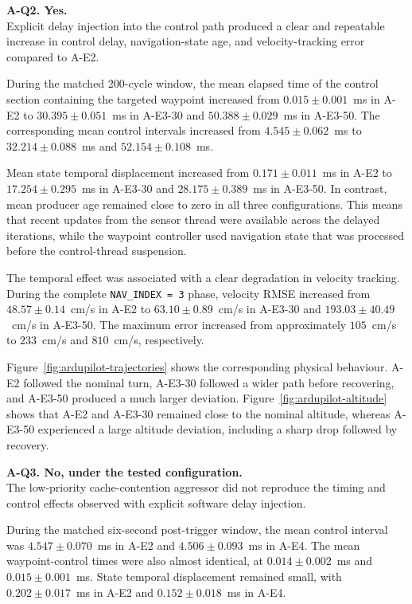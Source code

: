 \noindent \textbf{A-Q2. Yes.} \\
\noindent Explicit delay injection into the control path produced a clear and
repeatable increase in control delay, navigation-state age, and
velocity-tracking error compared to A-E2.

\noindent During the matched 200-cycle window, the mean elapsed time of the
control section containing the targeted waypoint increased from
\(0.015 \pm 0.001\)~ms in A-E2 to
\(30.395 \pm 0.051\)~ms in A-E3-30 and
\(50.388 \pm 0.029\)~ms in A-E3-50. The corresponding mean control
intervals increased from \(4.545 \pm 0.062\)~ms to
\(32.214 \pm 0.088\)~ms and \(52.154 \pm 0.108\)~ms.

\noindent Mean state temporal displacement increased from
\(0.171 \pm 0.011\)~ms in A-E2 to
\(17.254 \pm 0.295\)~ms in A-E3-30 and
\(28.175 \pm 0.389\)~ms in A-E3-50. In contrast, mean producer age
remained close to zero in all three configurations. This means that recent updates from the sensor thread were available across the delayed iterations, while the waypoint controller used navigation state that was processed before the control-thread suspension.

\noindent The temporal effect was associated with a clear degradation in velocity tracking. During the complete
\texttt{NAV\_INDEX = 3} phase, velocity RMSE increased from
\(48.57 \pm 0.14\)~cm/s in A-E2 to
\(63.10 \pm 0.89\)~cm/s in A-E3-30 and
\(193.03 \pm 40.49\)~cm/s in A-E3-50. The maximum error increased
from approximately \(105\)~cm/s to \(233\)~cm/s and \(810\)~cm/s,
respectively.

\noindent Figure~\ref{fig:ardupilot-trajectories} shows the corresponding
physical behaviour. A-E2 followed the nominal turn, A-E3-30 followed a
wider path before recovering, and A-E3-50 produced a much larger
deviation. Figure~\ref{fig:ardupilot-altitude} shows that A-E2 and
A-E3-30 remained close to the nominal altitude, whereas A-E3-50
experienced a large altitude deviation, including a sharp drop
followed by recovery.

\noindent \textbf{A-Q3. No, under the tested configuration.} \\
\noindent The low-priority cache-contention aggressor did not reproduce the
timing and control effects observed with explicit software delay
injection.

\noindent During the matched six-second post-trigger window, the mean control
interval was \(4.547 \pm 0.070\)~ms in A-E2 and
\(4.506 \pm 0.093\)~ms in A-E4. The mean waypoint-control times were
also almost identical, at \(0.014 \pm 0.002\)~ms and
\(0.015 \pm 0.001\)~ms. State temporal displacement remained small,
with \(0.202 \pm 0.017\)~ms in A-E2 and
\(0.152 \pm 0.018\)~ms in A-E4.

